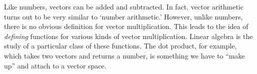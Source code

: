\documentclass[12pt]{article}
\begin{document}
Like numbers, vectors can be added and subtracted. In fact, vector arithmetic turns out to be very similar to `number arithmetic.' However, unlike numbers, there is no obvious definition for vector multiplication. This leads to the idea of \emph{defining} functions for various kinds of vector multiplication. Linear algebra is the study of a particular class of these functions. The dot product, for example, which takes two vectors and returns a number, is something we have to ``make up'' and attach to a vector space.

\end{document}
